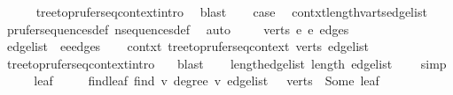 \begin{isabellebody}
\ \ \ \ \isamarkupfalse%
\ tree{\isacharunderscore}{\kern0pt}to{\isacharunderscore}{\kern0pt}prufer{\isacharunderscore}{\kern0pt}seq{\isacharunderscore}{\kern0pt}context{\isachardot}{\kern0pt}intro\ \isamarkupfalse%
\ blast\isanewline
\ \ \isamarkupfalse%
\ {\isacharquery}{\kern0pt}case\ \isamarkupfalse%
\ contxt{\isachardot}{\kern0pt}length{\isacharunderscore}{\kern0pt}varts{\isacharunderscore}{\kern0pt}edge{\isacharunderscore}{\kern0pt}list\ \isamarkupfalse%
\ prufer{\isacharunderscore}{\kern0pt}sequences{\isacharunderscore}{\kern0pt}def\ n{\isacharunderscore}{\kern0pt}sequences{\isacharunderscore}{\kern0pt}def\ \isamarkupfalse%
\ auto\isanewline
{}\isamarkupfalse%
\isanewline
\ \ \isamarkupfalse%
\ {\isacharparenleft}{\kern0pt}{}\ verts\ e{}\ e{}\ edges{\isacharparenright}{\kern0pt}\isanewline
\ \ \isamarkupfalse%
\ {\isacharquery}{\kern0pt}edge{\isacharunderscore}{\kern0pt}list\ {\isacharequal}{\kern0pt}\ {\isachardoublequoteopen}e{}{\isacharhash}{\kern0pt}e{}{\isacharhash}{\kern0pt}edges{\isachardoublequoteclose}\isanewline
\ \ \isamarkupfalse%
\ contxt{\isacharcolon}{\kern0pt}\ tree{\isacharunderscore}{\kern0pt}to{\isacharunderscore}{\kern0pt}prufer{\isacharunderscore}{\kern0pt}seq{\isacharunderscore}{\kern0pt}context\ verts\ {\isacharquery}{\kern0pt}edge{\isacharunderscore}{\kern0pt}list\isanewline
\ \ \ \ \isamarkupfalse%
\ tree{\isacharunderscore}{\kern0pt}to{\isacharunderscore}{\kern0pt}prufer{\isacharunderscore}{\kern0pt}seq{\isacharunderscore}{\kern0pt}context{\isachardot}{\kern0pt}intro\ {}\ \isamarkupfalse%
\ blast\isanewline
\ \ \isamarkupfalse%
\ length{\isacharunderscore}{\kern0pt}edge{\isacharunderscore}{\kern0pt}list{\isacharcolon}{\kern0pt}\ {\isachardoublequoteopen}length\ {\isacharquery}{\kern0pt}edge{\isacharunderscore}{\kern0pt}list\ {\isasymge}\ {}{\isachardoublequoteclose}\ \isamarkupfalse%
\ simp\isanewline
\ \ \isamarkupfalse%
\ \isamarkupfalse%
\ leaf\isanewline
\ \ \ \ \ find{\isacharunderscore}{\kern0pt}leaf{\isacharcolon}{\kern0pt}\ {\isachardoublequoteopen}find\ {\isacharparenleft}{\kern0pt}{\isasymlambda}v{\isachardot}{\kern0pt}\ degree\ v\ {\isacharquery}{\kern0pt}edge{\isacharunderscore}{\kern0pt}list\ {\isacharequal}{\kern0pt}\ {}{\isacharparenright}{\kern0pt}\ verts\ {\isacharequal}{\kern0pt}\ Some\ leaf{\isachardoublequoteclose}\isanewline

\end{isabellebody}

